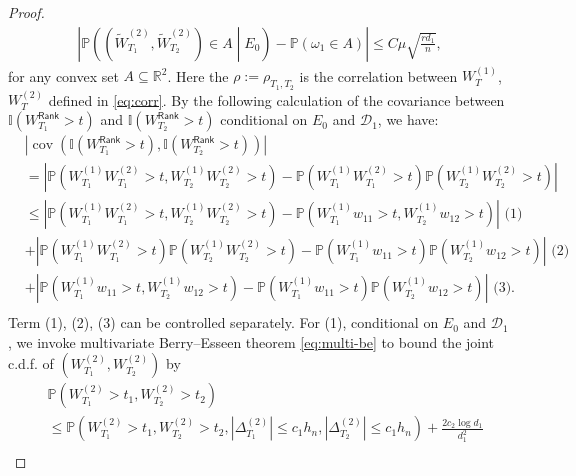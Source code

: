\documentclass[12pt]{article}
\newcommand{\abs}[1]{\left\lvert#1\right\rvert}
\newcommand{\PP}{\mathbb{P}}
\newcommand{\R}{\mathbb{R}}
\newcommand{\cD}{\mathcal{D}}
\newcommand{\bbI}{\mathbb{I}}
\def\PP{{\mathbb P}}
\theoremstyle{plain}
\begin{document}
\begin{proof}
\begin{equation}\label{eq:multi-be}
    \begin{aligned}
    \abs{\PP\left((\widetilde{W}^{(2)}_{T_1},\widetilde{W}^{(2)}_{T_2})\in {A} \middle| E_0 \right)-\PP(\omega_1\in{A})}\le C \mu \sqrt{\frac{r d_1}{n}},
    \end{aligned}
\end{equation}
for any convex set ${A} \subseteq \R^2$. Here the $\rho:=\rho_{T_1,T_2}$ is the correlation between $W^{(1)}_T$, $W^{(2)}_T$ defined in \eqref{eq:corr}. By the following calculation of the covariance between $\bbI(W_{T_1}^{\mathsf{Rank} }>t)$ and $\bbI(W_{T_2}^{\mathsf{Rank} }>t)$ conditional on $E_0$ and $\cD_1$, we have:
\begin{equation*}
\begin{aligned}
     &\abs{\operatorname{cov}(\bbI(W_{T_1}^{\mathsf{Rank} }>t),\bbI(W_{T_2}^{\mathsf{Rank} }>t)) } \\
     & = \abs{\PP(W^{(1)}_{T_1}W^{(2)}_{T_1} >t, W^{(1)}_{T_2}W^{(2)}_{T_2}>t )- \PP(W^{(1)}_{T_1}W^{(2)}_{T_1} >t )\PP(W^{(1)}_{T_2}W^{(2)}_{T_2} >t ) } \\
     & \le \abs{\PP(W^{(1)}_{T_1}W^{(2)}_{T_1} >t, W^{(1)}_{T_2}W^{(2)}_{T_2}>t )- \PP( {W}^{(1)}_{T_1} w_{11} > t, {W}^{(1)}_{T_2}w_{12} > t  )} \text{ (1)}\\ &+\abs{\PP(W^{(1)}_{T_1}W^{(2)}_{T_1} >t )\PP(W^{(1)}_{T_2}W^{(2)}_{T_2} >t )- \PP( {W}^{(1)}_{T_1} w_{11} > t  )\PP( {W}^{(1)}_{T_2} w_{12} > t  ) } \text{ (2)}\\
     &+\abs{\PP( {W}^{(1)}_{T_1} w_{11} > t, {W}^{(1)}_{T_2}w_{12} > t  )- \PP( {W}^{(1)}_{T_1} w_{11} > t  )\PP( {W}^{(1)}_{T_2} w_{12} > t  ) } \text{ (3)}.\\
\end{aligned}
\end{equation*}
Term (1), (2), (3) can be controlled separately. For (1), conditional on $E_0$ and $\cD_1$, we invoke multivariate Berry--Esseen theorem \eqref{eq:multi-be} to bound the joint c.d.f. of $(W^{(2)}_{T_1}, W^{(2)}_{T_2})$ by  
\begin{equation*}
    \begin{aligned}
    &\PP(W^{(2)}_{T_1} >t_1, W^{(2)}_{T_2}>t_2 ) \\
    &\le  \PP(W^{(2)}_{T_1} >t_1, W^{(2)}_{T_2}>t_2,\abs{\Delta^{(2)}_{T_1}}\le c_1 h_n,\abs{\Delta^{(2)}_{T_2}}\le c_1 h_n  ) +\frac{2c_2 \log d_1}{d_1^2}\\ %

\end{aligned}
\end{equation*}
\end{proof}
\end{document}
